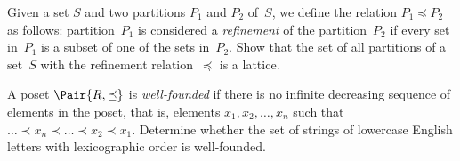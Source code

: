 \documentclass[a4paper,12pt]{article}
\begin{document}
\begin{tasks}
    \item Given a set $S$ and two partitions $P_1$ and $P_2$ of~$S$, we define the relation $P_1 \preceq P_2$ as follows: partition~$P_1$ is considered a \textit{refinement} of the partition~$P_2$ if every set in~$P_1$ is a subset of one of the sets in~$P_2$.
    Show that the set of all partitions of a set~$S$ with the refinement relation~$\preceq$ is a lattice.


    \item A poset $\Pair{R, \preceq}$ is \emph{well-founded} if there is no infinite decreasing sequence of elements in the poset, that is, elements $x_1, x_2, \dots, x_n$ such that $\dots \prec x_n \prec \dots \prec x_2 \prec x_1$.
    Determine whether the set of strings of lowercase English letters with lexicographic order is well-founded.


\end{tasks}
\end{document}
